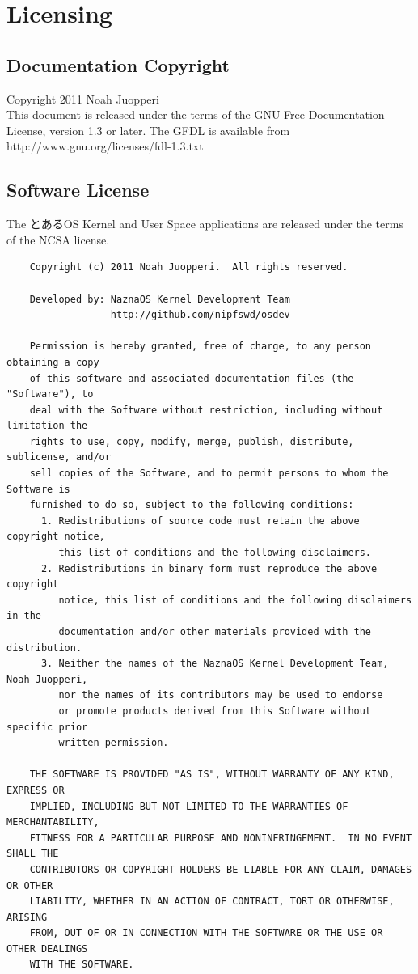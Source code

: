 \section{Licensing}

\subsection{Documentation Copyright}

Copyright 2011 Noah Juopperi \\
This document is released under the terms of the GNU Free Documentation License, version 1.3 or later.
The GFDL is available from http://www.gnu.org/licenses/fdl-1.3.txt


\subsection{Software License}

The とあるOS Kernel and User Space applications are released under the terms of the NCSA license.

\begin{verbatim}
    Copyright (c) 2011 Noah Juopperi.  All rights reserved.

    Developed by: NaznaOS Kernel Development Team
                  http://github.com/nipfswd/osdev

    Permission is hereby granted, free of charge, to any person obtaining a copy
    of this software and associated documentation files (the "Software"), to
    deal with the Software without restriction, including without limitation the
    rights to use, copy, modify, merge, publish, distribute, sublicense, and/or
    sell copies of the Software, and to permit persons to whom the Software is
    furnished to do so, subject to the following conditions:
      1. Redistributions of source code must retain the above copyright notice,
         this list of conditions and the following disclaimers.
      2. Redistributions in binary form must reproduce the above copyright
         notice, this list of conditions and the following disclaimers in the
         documentation and/or other materials provided with the distribution.
      3. Neither the names of the NaznaOS Kernel Development Team, Noah Juopperi,
         nor the names of its contributors may be used to endorse
         or promote products derived from this Software without specific prior
         written permission.

    THE SOFTWARE IS PROVIDED "AS IS", WITHOUT WARRANTY OF ANY KIND, EXPRESS OR
    IMPLIED, INCLUDING BUT NOT LIMITED TO THE WARRANTIES OF MERCHANTABILITY,
    FITNESS FOR A PARTICULAR PURPOSE AND NONINFRINGEMENT.  IN NO EVENT SHALL THE
    CONTRIBUTORS OR COPYRIGHT HOLDERS BE LIABLE FOR ANY CLAIM, DAMAGES OR OTHER
    LIABILITY, WHETHER IN AN ACTION OF CONTRACT, TORT OR OTHERWISE, ARISING
    FROM, OUT OF OR IN CONNECTION WITH THE SOFTWARE OR THE USE OR OTHER DEALINGS
    WITH THE SOFTWARE.
\end{verbatim}